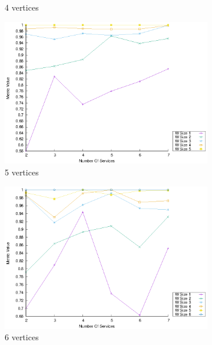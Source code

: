 \begin{figure}[!htb]
\begin{subfigure}{0.33\textwidth}
    \caption{4 vertices}
    \label{fig:quality_window_perce_wide_4n}
  \end{subfigure}
  \hfill
  \begin{subfigure}{0.33\textwidth}
    \includegraphics[width=\textwidth]{Images/graphs/window_quality_performance_diff_perce_n7_s7_20_100_n5}
    \caption{5 vertices}
    \label{fig:quality_window_perce_wide_5n}
  \end{subfigure}
  \hfill
  \begin{subfigure}{0.33\textwidth}
    \includegraphics[width=\textwidth]{Images/graphs/window_quality_performance_diff_perce_n7_s7_20_100_n6}
    \caption{6 vertices}
    \label{fig:quality_window_perce_wide_6n}
  \end{subfigure}
  \begin{subfigure}{0.33\textwidth}

\end{subfigure}
\end{figure}
